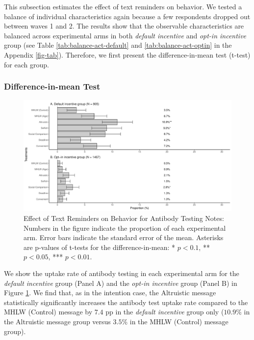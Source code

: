 \documentclass[
]{article}
\begin{document}
This subsection estimates the effect of text reminders on behavior. We tested a balance of individual characteristics again because a few respondents dropped out between waves 1 and 2. The results show that the observable characteristics are balanced across experimental arms in both \emph{default incentive} and \emph{opt-in incentive} group (see Table \ref{tab:balance-act-default} and \ref{tab:balance-act-optin} in the Appendix \ref{fig-tab}). Therefore, we first present the difference-in-mean test (t-test) for each group.

\hypertarget{difference-in-mean-test-1}{%
\subsubsection{Difference-in-mean Test}\label{difference-in-mean-test-1}}

\begin{figure}[t]
\includegraphics{discussion-paper_files/figure-latex/ttest-act-test-1} \caption{Effect of Text Reminders on Behavior for Antibody Testing Notes: Numbers in the figure indicate the proportion of each experimental arm. Error bars indicate the standard error of the mean. Asterisks are p-values of t-tests for the difference-in-mean: * $p < 0.1$, ** $p < 0.05$, *** $p < 0.01$.}\label{fig:ttest-act-test}
\end{figure}

We show the uptake rate of antibody testing in each experimental arm for the \emph{default incentive} group (Panel A) and the \emph{opt-in incentive} group (Panel B) in Figure \ref{fig:ttest-act-test}. We find that, as in the intention case, the Altruistic message statistically significantly increases the antibody test uptake rate compared to the MHLW (Control) message by \(7.4\) pp in the \emph{default incentive} group only (\(10.9\)\% in the Altruistic message group versus \(3.5\)\% in the MHLW (Control) message group).
\end{document}

